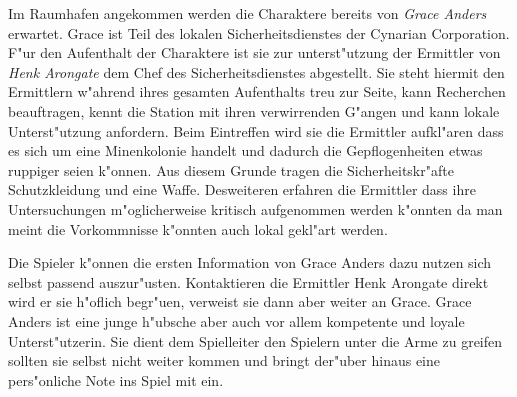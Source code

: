 Im Raumhafen angekommen werden die Charaktere bereits von \emph{Grace Anders} erwartet. Grace ist Teil des lokalen Sicherheitsdienstes der Cynarian Corporation. F"ur den Aufenthalt der Charaktere ist sie zur unterst"utzung der Ermittler von \emph{Henk Arongate} dem Chef des Sicherheitsdienstes abgestellt. Sie steht hiermit den Ermittlern w"ahrend ihres gesamten Aufenthalts treu zur Seite, kann Recherchen beauftragen, kennt die Station mit ihren verwirrenden G"angen und kann lokale Unterst"utzung anfordern. Beim Eintreffen wird sie die Ermittler aufkl"aren dass es sich um eine Minenkolonie handelt und dadurch die Gepflogenheiten etwas ruppiger seien k"onnen. Aus diesem Grunde tragen die Sicherheitskr"afte Schutzkleidung und eine Waffe. Desweiteren erfahren die Ermittler dass ihre Untersuchungen m"oglicherweise kritisch aufgenommen werden k"onnten da man meint die Vorkommnisse k"onnten auch lokal gekl"art werden.

\begin{remarks}
	Die Spieler k"onnen die ersten Information von Grace Anders dazu nutzen sich selbst passend auszur"usten. Kontaktieren die Ermittler Henk Arongate direkt wird er sie h"oflich begr"u\3en, verweist sie dann aber weiter an Grace. Grace Anders ist eine junge h"ubsche aber auch vor allem kompetente und loyale Unterst"utzerin. Sie dient dem Spielleiter den Spielern unter die Arme zu greifen sollten sie selbst nicht weiter kommen und bringt der"uber hinaus eine pers"onliche Note ins Spiel mit ein.
\end{remarks}

